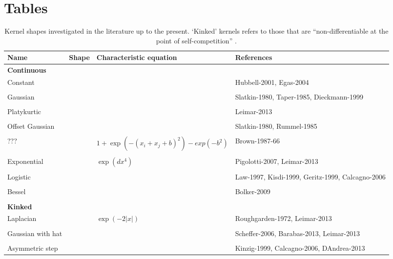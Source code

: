 \documentclass[a4paper,11pt]{article}
\begin{document}
\clearpage

\section{Tables}


\begin{table}[h]
 \caption{Kernel shapes investigated in the literature up to the present.
`Kinked' kernels refers to those that are ``non-differentiable at the point of
self-competition'' \citep{Barabas-2012}.}
\centering
{\footnotesize
  \begin{tabular}{p{3cm}p{4cm}p{3cm}p{4cm}}
  \hline
  Name & Shape & Characteristic equation & References \\
  \hline
  \multicolumn{4}{l}{\textbf{Continuous}} \\
  Constant & & & Hubbell-2001, Egas-2004 \\ \\
  Gaussian & & & Slatkin-1980, Taper-1985,
  Dieckmann-1999\\ \\
  Platykurtic & & &  Leimar-2013 \\ \\
  Offset Gaussian & & & Slatkin-1980, Rummel-1985\\ \\
  ??? & & $1 + \exp(-(x_i + x_j + b)^2) - exp(-b^2)$ & Brown-1987-66 \\ \\
  Exponential & & $\exp(dx^4)$ &Pigolotti-2007, Leimar-2013\\ \\
  Logistic & & & Law-1997, Kisdi-1999, Geritz-1999, Calcagno-2006\\ \\
  Bessel & & & Bolker-2009\\ \\
 \multicolumn{4}{l}{\textbf{Kinked}} \\
  Laplacian & & $\exp(-2|x|)$ & Roughgarden-1972, Leimar-2013 \\ \\
  Gaussian with hat & & & Scheffer-2006, Barabas-2013, Leimar-2013 \\ \\
  Asymmetric step & & & Kinzig-1999, Calcagno-2006, DAndrea-2013 \\
  \hline
  \end{tabular}
}
\label{tab:shapes}
\end{table}
\end{document}
